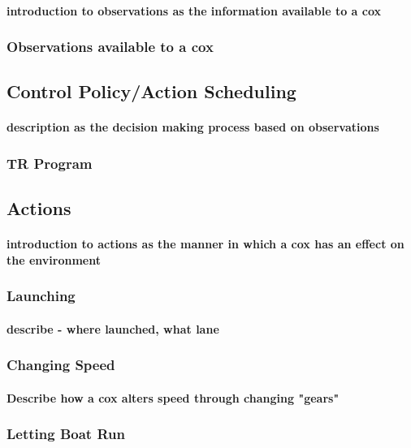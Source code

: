      \paragraph{introduction to observations as the information available to a cox}
      
      \subsubsection{Observations available to a cox}
      
    \subsection{Control Policy/Action Scheduling}
      \paragraph{description as the decision making process based on observations}
      \subsubsection{TR Program}
    
    \subsection{Actions}
      \paragraph{introduction to actions as the manner in which a cox has an effect on the environment}
      \subsubsection{Launching}
        \paragraph{describe - where launched, what lane}
      \subsubsection{Changing Speed}
        \paragraph{Describe how a cox alters speed through changing "gears"}
      \subsubsection{Letting Boat Run}
